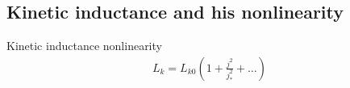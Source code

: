 \documentclass[../main.tex]{subfiles}
\begin{document}
\subsection{Kinetic inductance and his nonlinearity}




\begin{frame}{Kinetic inductance nonlinearity}
\begin{gather*}
    L_{k} = L_{k0}\left(1 + \frac{j^2}{j_{*}^2} + \dots\right)\\
\end{gather*}
\end{frame}

%
\end{document}
